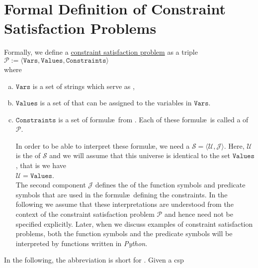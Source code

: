 \section[Formal Definition of \textsc{Csp}s]{Formal Definition of Constraint Satisfaction Problems}
Formally, we define a 
\href{https://en.wikipedia.org/wiki/Constraint_satisfaction_problem}{constraint satisfaction problem} as a triple
\\[0.2cm]
\hspace*{1.3cm}
$\mathcal{P} := \langle \texttt{Vars}, \texttt{Values}, \texttt{Constraints} \rangle$
\\[0.2cm]
where 
\begin{enumerate}[(a)]
\item $\texttt{Vars}$ is a set of strings which serve as ,
\item $\texttt{Values}$ is a set of  that can be assigned to the variables in $\texttt{Vars}$.
\item $\texttt{Constraints}$ is a set of formul\ae\ from .  Each of these formul\ae\ is
      called a  of $\mathcal{P}$.

      In order to be able to interpret these formul\ae, we need a  $\mathcal{S} = \langle \mathcal{U}, \mathcal{J} \rangle$.  
      Here, $\mathcal{U}$ is the  of $\mathcal{S}$ and we will assume that this
      universe is identical to the set $\texttt{Values}$, that is we have
      \\[0.2cm]
      \hspace*{1.3cm}
      $\mathcal{U} = \texttt{Values}$.
      \\[0.2cm]
      The second component $\mathcal{J}$ defines the
       of the function symbols and predicate symbols that are used in the formul\ae\
      defining the constraints.  In the following we assume that these interpretations are understood from the
      context of the constraint satisfaction problem $\mathcal{P}$ and hence need not be specified explicitly.
      Later, when we discuss examples of constraint 
      satisfaction problems, both the function symbols and the predicate symbols will be interpreted
      by functions written in \textsl{Python}.
\end{enumerate}
In the following, the abbreviation  is short for .
Given a \ac{csp}
\\[0.2cm]
